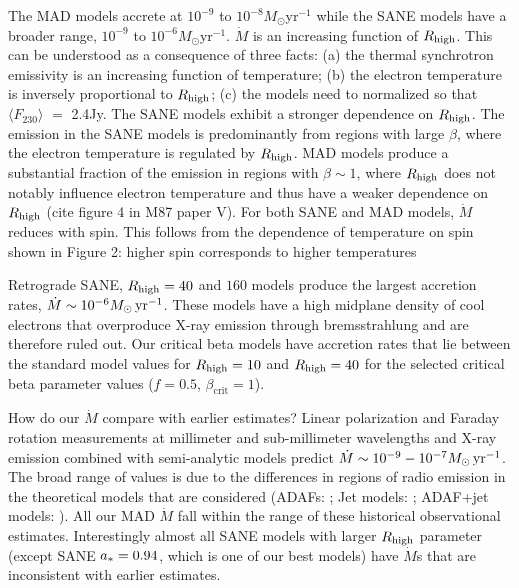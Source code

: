The MAD models accrete at $10^{-9}$ to $10^{-8} M_{\odot}$yr$^{-1}$ while the SANE models have a broader range, $10^{-9}$ to $10^{-6} M_{\odot}$yr$^{-1}$.
$\dot{M}$ is an increasing function of $R_\mathrm{high}$.
This can be understood as a consequence of three facts: (a) the thermal synchrotron emissivity is an increasing function of temperature; (b) the electron temperature is inversely proportional to $R_\mathrm{high}$; (c) the models need to normalized so that $\langle F_{230}\rangle$ $=$ 2.4Jy.
The SANE models exhibit a stronger dependence on $R_\mathrm{high}$.
The emission in the SANE models is predominantly from regions with large $\beta$, where the electron temperature is regulated by $R_\mathrm{high}$.
MAD models produce a substantial fraction of the emission in regions with $\beta\sim 1$, where $R_\mathrm{high}$ does not notably influence electron temperature and thus have a weaker dependence on $R_\mathrm{high}$ (cite figure 4 in M87 paper V).
For both SANE and MAD models, $\dot{M}$ reduces with spin.
This follows from the dependence of temperature on spin shown in Figure 2: higher spin corresponds to higher temperatures

Retrograde SANE, $R_\mathrm{high}=40$ and $160$ models produce the largest accretion rates, $\dot{M} \sim 10^{-6}M_{\odot}\,\mathrm{yr}^{-1}$.
These models have a high midplane density of cool electrons that overproduce X-ray emission through bremsstrahlung and are therefore ruled out.
 Our critical beta models have accretion rates that lie between the standard model values for $R_\mathrm{high} = 10$ and $R_\mathrm{high} = 40$ for the selected critical beta parameter values ($f=0.5$, $\beta_\mathrm{crit}=1$).

How do our $\dot{M}$ compare with earlier estimates?  Linear polarization and Faraday rotation measurements at millimeter and sub-millimeter wavelengths \citep{2000ApJ...538L.121A, 2000ApJ...545..842Q, 2003ApJ...588..331B, 2006ApJ...640..308M, 2006JPhCS..54..354M, 2006ApJ...646L.111M} and X-ray emission \citep{2003ApJ...591..891B, doi:10.1126/science.1240755} combined  with semi-analytic models predict $\dot{M} \sim 10^{-9} - 10^{-7} M_{\odot}\,\mathrm{yr}^{-1}$.
The broad range of values is due to the differences in regions of radio emission in the theoretical models that are considered (ADAFs: \citealt{1998ApJ...492..554N, Yuan_2003}; Jet models: \citealt{1993A&A...278L...1F, 2000A&A...362..113F}; ADAF+jet models: \citealt{2002A&A...383..854Y}).
All our MAD $\dot{M}$ fall within the range of these historical observational estimates.
Interestingly almost all SANE models with larger $R_\mathrm{high}$ parameter (except SANE $a_*=0.94$, which is one of our best models) have $\dot{M}$s that are inconsistent with earlier estimates.

